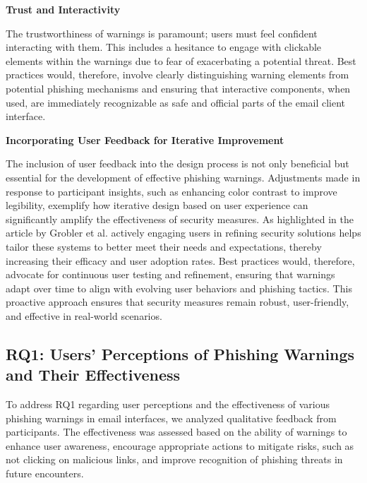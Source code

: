 \documentclass[
  a4paper,  %
  twoside,  %
  bibliography=totoc,
  headsepline,
  cleardoublepage=empty,
  parskip=half,
  draft=false
]{scrbook}
\begin{document}
\textbf{Trust and Interactivity}

The trustworthiness of warnings is paramount; users must feel confident interacting with them. This includes a hesitance to engage with clickable elements within the warnings due to fear of exacerbating a potential threat. Best practices would, therefore, involve clearly distinguishing warning elements from potential phishing mechanisms and ensuring that interactive components, when used, are immediately recognizable as safe and official parts of the email client interface.

\textbf{Incorporating User Feedback for Iterative Improvement}

The inclusion of user feedback into the design process is not only beneficial but essential for the development of effective phishing warnings. Adjustments made in response to participant insights, such as enhancing color contrast to improve legibility, exemplify how iterative design based on user experience can significantly amplify the effectiveness of security measures. As highlighted in the article by Grobler et al. \cite{grobler} actively engaging users in refining security solutions helps tailor these systems to better meet their needs and expectations, thereby increasing their efficacy and user adoption rates. Best practices would, therefore, advocate for continuous user testing and refinement, ensuring that warnings adapt over time to align with evolving user behaviors and phishing tactics. This proactive approach ensures that security measures remain robust, user-friendly, and effective in real-world scenarios.

\subsection{RQ1: Users’ Perceptions of Phishing Warnings and Their Effectiveness}
To address RQ1 regarding user perceptions and the effectiveness of various phishing warnings in email interfaces, we analyzed qualitative feedback from participants. The effectiveness was assessed based on the ability of warnings to enhance user awareness, encourage appropriate actions to mitigate risks, such as not clicking on malicious links, and improve recognition of phishing threats in future encounters.
\end{document}
